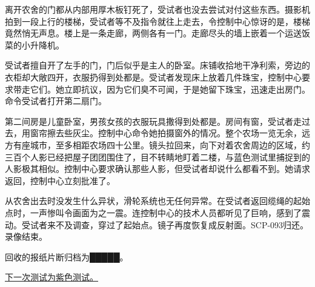 \begin{scpbox}
离开农舍的门都从内部用厚木板钉死了，受试者也没去尝试对付这些东西。摄影机拍到一段上行的楼梯，受试者等不及指令就往上走去，令控制中心惊讶的是，楼梯竟然悄无声息。楼上是一条走廊，两侧各有一门。走廊尽头的墙上嵌着一个运送饭菜的小升降机。

受试者擅自开了左手的门，门后似乎是主人的卧室。床铺收拾地干净利索，旁边的衣柜却大敞四开，衣服扔得到处都是。受试者发现床上放着几件珠宝，控制中心要求带走它们。她立即抗议，因为它们臭不可闻，于是她留下珠宝，迅速走出房门。命令受试者打开第二扇门。

第二间房是儿童卧室，男孩女孩的衣服玩具撒得到处都是。房间有窗，受试者走过去，用窗帘擦去些灰尘。控制中心命令她拍摄窗外的情况。整个农场一览无余，远方有座城市，至多相距农场四十公里。镜头拉回来，向下对着农舍周边的区域，约三百个人影已经把屋子团团围住了，目不转睛地盯着二楼，与蓝色测试里捕捉到的人影极其相似。控制中心要求确认那些人影，但受试者却说什么都看不到。她请求返回，控制中心立刻批准了。

从农舍出去时没发生什么异状，滑轮系统也无任何异常。在受试者返回缆绳的起始点时，一声惨叫令画面为之一震。连控制中心的技术人员都听见了巨响，感到了震动。受试者来不及调查，穿过了起始点。镜子再度恢复成反射面。SCP-093归还。录像结束。

回收的报纸片断归档为█████。

\end{scpbox}

\hyperref[sec:DOC-scp-093-violet-test]{下一次测试为紫色测试。}
